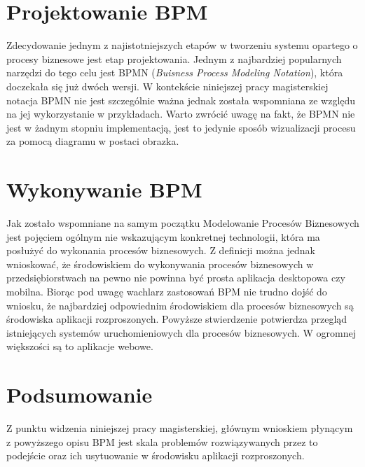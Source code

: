 
\section{Projektowanie BPM}
\label{sec:projektowanieBPM}


Zdecydowanie jednym z najistotniejszych etapów w tworzeniu systemu opartego o procesy biznesowe jest etap projektowania. Jednym z najbardziej popularnych narzędzi do tego celu jest BPMN (\textit{Buisness Process Modeling Notation}), która doczekała się już dwóch wersji. W kontekście niniejszej pracy magisterskiej notacja BPMN nie jest szczególnie ważna jednak została wspomniana ze względu na jej wykorzystanie w przykładach. Warto zwrócić uwagę  na fakt, że BPMN nie jest w żadnym stopniu implementacją, jest to jedynie sposób wizualizacji procesu za pomocą diagramu w postaci obrazka.




\section{Wykonywanie BPM}
\label{sec:wykonywanieBPM}

Jak zostało wspomniane na samym początku Modelowanie Procesów Biznesowych jest pojęciem ogólnym nie wskazującym konkretnej technologii, która ma posłużyć do wykonania procesów biznesowych. Z definicji można jednak wnioskować, że środowiskiem do wykonywania procesów biznesowych w przedsiębiorstwach na pewno nie powinna być prosta aplikacja desktopowa czy mobilna. Biorąc pod uwagę wachlarz zastosowań BPM nie trudno dojść do wniosku, że najbardziej odpowiednim środowiskiem dla procesów biznesowych są środowiska aplikacji rozproszonych. 
Powyższe stwierdzenie potwierdza przegląd istniejących systemów uruchomieniowych dla procesów biznesowych. W ogromnej większości są to aplikacje webowe. 


\section{Podsumowanie}
\label{sec:podsumowanieBPM}

Z punktu widzenia niniejszej pracy magisterskiej, głównym wnioskiem płynącym z powyższego opisu BPM jest skala problemów rozwiązywanych przez to podejście oraz ich usytuowanie w środowisku aplikacji rozproszonych. 

